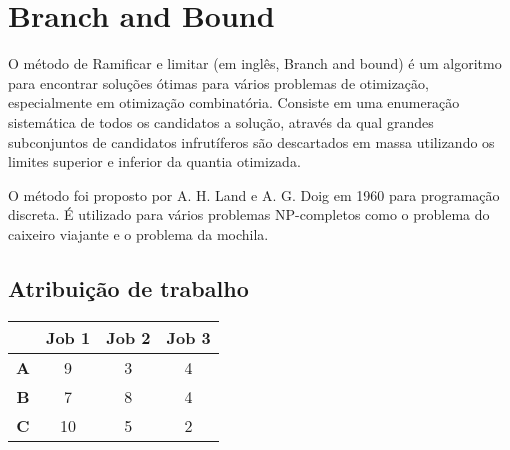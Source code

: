 \section{Branch and Bound} \label{sec:branch-and-bound}

O método de Ramificar e limitar (em inglês, Branch and bound) é um algoritmo para 
encontrar soluções ótimas para vários problemas de otimização, especialmente em 
otimização combinatória. Consiste em uma enumeração sistemática de todos os candidatos
a solução, através da qual grandes subconjuntos de candidatos infrutíferos são 
descartados em massa utilizando os limites superior e inferior da quantia otimizada.

O método foi proposto por A. H. Land e A. G. Doig em 1960 para programação discreta.
É utilizado para vários problemas NP-completos como o problema do caixeiro viajante
e o problema da mochila. 

\subsection{Atribuição de trabalho}


\begin{table}[ht]
    \centering 
    \begin{tabular}{|c | c | c | c |} 
        \hline
         & \textbf{Job 1} & \textbf{Job 2} & \textbf{Job 3} \\ 
        \hline
        \textbf{A} & 9 & 3 & 4 \\ 
        \hline
        \textbf{B} & 7 & 8 & 4 \\
        \hline
        \textbf{C} & 10 & 5 & 2 \\
        \hline
   \end{tabular}
\end{table}
